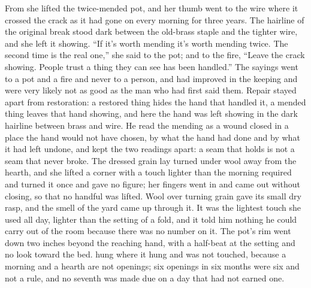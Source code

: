 From  she lifted the twice-mended pot, and her thumb went to the wire where it crossed the crack as it had gone on every morning for three years. The hairline of the original break stood dark between the old-brass staple and the tighter wire, and she left it showing. “If it's worth mending it's worth mending twice. The second time is the real one,” she said to the pot; and to the fire, “Leave the crack showing. People trust a thing they can see has been handled.” The sayings went to a pot and a fire and never to a person, and had improved in the keeping and were very likely not as good as the man who had first said them. Repair stayed apart from restoration: a restored thing hides the hand that handled it, a mended thing leaves that hand showing, and here the hand was left showing in the dark hairline between brass and wire. He read the mending as a wound closed in a place the hand would not have chosen, by what the hand had done and by what it had left undone, and kept the two readings apart: a seam that holds is not a seam that never broke. The dressed grain lay turned under wool away from the hearth, and she lifted a corner with a touch lighter than the morning required and turned it once and gave no figure; her fingers went in and came out without closing, so that no handful was lifted. Wool over turning grain gave its small dry rasp, and the smell of the yard came up through it. It was the lightest touch she used all day, lighter than the setting of a fold, and it told him nothing he could carry out of the room because there was no number on it. The pot's rim went down two inches beyond the reaching hand, with a half-beat at the setting and no look toward the bed.  hung where it hung and was not touched, because a morning and a hearth are not openings; six openings in six months were six and not a rule, and no seventh was made due on a day that had not earned one.

\scenebreak

